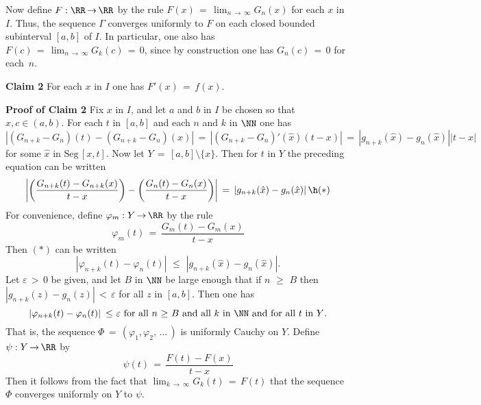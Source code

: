         Now define $F:{\RR} \,{\rightarrow}\, {\RR}$ by the rule $F(x) \,=\, \lim_{n \,{\rightarrow}\, {\infty}} G_{n}(x)$ for each $x$ in $I$.
    Thus, the sequence ${\Gamma}$ converges uniformly to $F$ on each closed bounded subinterval $[a,b]$ of $I$.
    In particular, one also has $F(c) \,=\, \lim_{n \,{\rightarrow}\, {\infty}} G_{k}(c) \,=\, 0$, since by construction one has $G_{n}(c) \,=\, 0$ for each~$n$.

        {\bf Claim 2} For each $x$ in $I$ one has $F'(x) \,=\, f(x)$.

        {\bf Proof of Claim 2} Fix $x$ in $I$, and let $a$ and $b$ in $I$ be chosen so that $x,c{\in}(a,b)$.
    For each $t$ in $[a,b]$ and each $n$ and $k$ in ${\NN}$ one has
        \begin{displaymath}
        \left|\left(G_{n+k} - G_{n}\right)(t) - \left(G_{n+k} - G_{n}\right)(x)\right| \,=\, 
        \left|\left(G_{n+k} - G_{n}\right)'(\hat{x})(t-x)\right| \,=\, 
        \left|g_{n+k}(\hat{x}) - g_{n}(\hat{x})\right||t-x|
        \end{displaymath}
    for some $\hat{x}$ in $\mbox{Seg}\,[x,t]$. Now let $Y \,=\, [a,b]{\setminus}\{x\}$.
    Then for $t$ in $Y$ the preceding equation can be written
        \begin{displaymath}
        \left|\left(\frac{G_{n+k}(t) - G_{n+k}(x)}{t-x}\right) -
    \left(\frac{G_{n}(t) - G_{n}(x)}{t-x}\right)\right| \,=\, \left|g_{n+k}(\hat{x}) - g_{n}(\hat{x})\right| \h ({\ast})
        \end{displaymath}
    For convenience, define ${\varphi}_{m}:Y \,{\rightarrow}\, {\RR}$ by the rule
        \begin{displaymath}
        {\varphi}_{m}(t) \,=\, \frac{G_{m}(t) - G_{m}(x)}{t-x}
        \end{displaymath}
    Then $({\ast})$ can be written
        \begin{displaymath}
        \left|{\varphi}_{n+k}(t) - {\varphi}_{n}(t)\right|\,\,{\leq}\,\,|g_{n+k}(\hat{x})-g_{n}(\hat{x})|.
        \end{displaymath}
    Let ${\varepsilon}\,>\,0$ be given, and let $B$ in ${\NN}$ be large enough that if $n\,\,{\geq}\,\,B$ then $|g_{n+k}(z)-g_{n}(z)|\,<\,{\varepsilon}$ for all $z$ in $[a,b]$.
    Then one has
        \begin{displaymath}
        \left|{\varphi}_{n+k}(t) - {\varphi}_{n}(t)\right|\,\,{\leq}\,\,{\varepsilon} \mbox{ for all $n\,\,{\geq}\,\,B$ and all $k$ in ${\NN}$ and for all $t$ in $Y$}.
        \end{displaymath}
    That is, the sequence ${\Phi} \,=\, ({\varphi}_{1},{\varphi}_{2},\,{\ldots}\,)$ is uniformly Cauchy on $Y$.
    Define ${\psi}:Y \,{\rightarrow}\, {\RR}$ by
        \begin{displaymath}
        {\psi}(t) \,=\, \frac{F(t) - F(x)}{t-x}
        \end{displaymath}
    Then it follows from the fact that $\lim_{k \,{\rightarrow}\, {\infty}} G_{k}(t) \,=\, F(t)$ that the sequence ${\Phi}$ converges uniformly on $Y$ to ${\psi}$.

